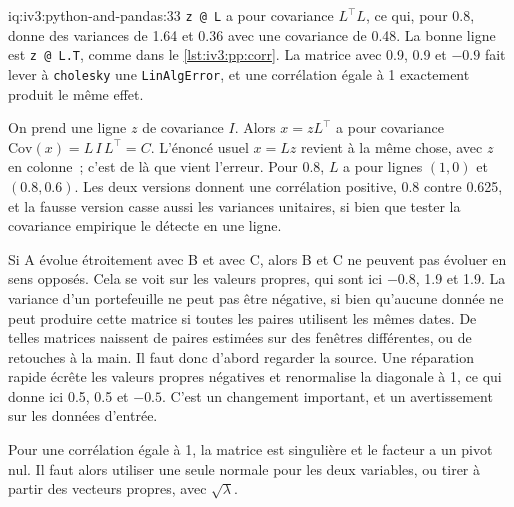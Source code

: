 \begin{solution}{iq:iv3:python-and-pandas:33}
\texttt{z @ L} a pour covariance $L^\top L$, ce qui, pour 0.8, donne des variances de 1.64 et 0.36 avec une covariance de 0.48. La bonne ligne est \texttt{z @ L.T}, comme dans le \cref{lst:iv3:pp:corr}. La matrice avec 0.9, 0.9 et $-0.9$ fait lever à \texttt{cholesky} une \texttt{LinAlgError}, et une corrélation égale à 1 exactement produit le même effet.
\label{lst:iv3:pp:corr}

On prend une ligne $z$ de covariance $I$. Alors $x = z L^\top$ a pour covariance $\text{Cov}(x) = L\, I\, L^\top = C$. L'énoncé usuel $x = L z$ revient à la même chose, avec $z$ en colonne~; c'est de là que vient l'erreur. Pour 0.8, $L$ a pour lignes $(1, 0)$ et $(0.8, 0.6)$. Les deux versions donnent une corrélation positive, 0.8 contre 0.625, et la fausse version casse aussi les variances unitaires, si bien que tester la covariance empirique le détecte en une ligne.

Si A évolue étroitement avec B et avec C, alors B et C ne peuvent pas évoluer en sens opposés. Cela se voit sur les valeurs propres, qui sont ici $-0.8$, 1.9 et 1.9. La variance d'un portefeuille ne peut pas être négative, si bien qu'aucune donnée ne peut produire cette matrice si toutes les paires utilisent les mêmes dates. De telles matrices naissent de paires estimées sur des fenêtres différentes, ou de retouches à la main. Il faut donc d'abord regarder la source. Une réparation rapide écrête les valeurs propres négatives et renormalise la diagonale à 1, ce qui donne ici 0.5, 0.5 et $-0.5$. C'est un changement important, et un avertissement sur les données d'entrée.

Pour une corrélation égale à 1, la matrice est singulière et le facteur a un pivot nul. Il faut alors utiliser une seule normale pour les deux variables, ou tirer à partir des vecteurs propres, avec $\sqrt{\lambda}$.

\end{solution}

